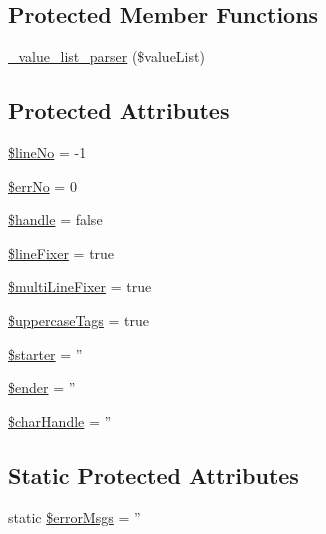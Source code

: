 \subsection*{Protected Member Functions}
\begin{DoxyCompactItemize}
\item 
\hyperlink{classSAVI__Parser_a67ad30f64dcdbd2dad8787ba3f5aeb5e}{\_\-value\_\-list\_\-parser} (\$valueList)
\end{DoxyCompactItemize}
\subsection*{Protected Attributes}
\begin{DoxyCompactItemize}
\item 
\hyperlink{classSAVI__Parser_a9e2fcfa96c544bf4bd3c5a71a7bf2739}{\$lineNo} = -\/1
\item 
\hyperlink{classSAVI__Parser_a63d046010fb22e14107bd3861e1d9dd5}{\$errNo} = 0
\item 
\hyperlink{classSAVI__Parser_ad86c3fbc5672e1deeafc5229012b0b5d}{\$handle} = false
\item 
\hyperlink{classSAVI__Parser_ac37a18f959e7a225e0a690852367523d}{\$lineFixer} = true
\item 
\hyperlink{classSAVI__Parser_a87f087d55e041fbc48604cfe47019f6e}{\$multiLineFixer} = true
\item 
\hyperlink{classSAVI__Parser_ab025198049ed7f6ff96c43aba8c4ad20}{\$uppercaseTags} = true
\item 
\hyperlink{classSAVI__Parser_a0a6ff866cad56154d31e649d69ac8c0f}{\$starter} = ''
\item 
\hyperlink{classSAVI__Parser_accbd2f26bb805e2a243cab5498237ac8}{\$ender} = ''
\item 
\hyperlink{classSAVI__Parser_a5a878b1c34cc555349cbc4acbcdd54e7}{\$charHandle} = ''
\end{DoxyCompactItemize}
\subsection*{Static Protected Attributes}
\begin{DoxyCompactItemize}
\item 
static \hyperlink{classSAVI__Parser_af21b3b8a4d4bcfa682cd5f411e0eb566}{\$errorMsgs} = ''
\end{DoxyCompactItemize}
